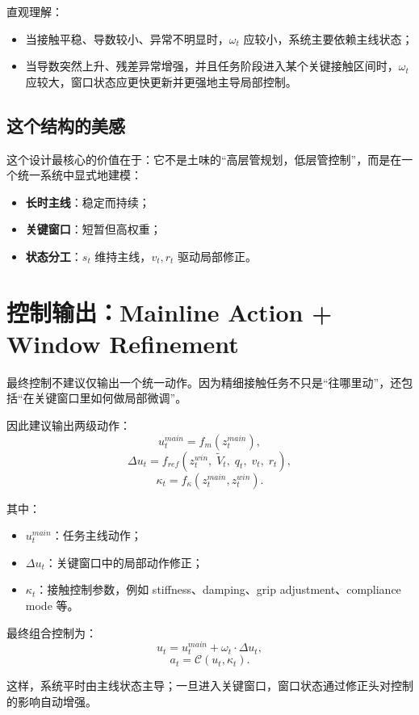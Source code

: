 \documentclass[11pt]{article}
\begin{document}
直观理解：
\begin{itemize}[leftmargin=2em]
    \item 当接触平稳、导数较小、异常不明显时，$\omega_t$ 应较小，系统主要依赖主线状态；
    \item 当导数突然上升、残差异常增强，并且任务阶段进入某个关键接触区间时，$\omega_t$ 应较大，窗口状态应更快更新并更强地主导局部控制。
\end{itemize}

\subsection{这个结构的美感}

这个设计最核心的价值在于：它不是土味的“高层管规划，低层管控制”，而是在一个统一系统中显式地建模：
\begin{itemize}[leftmargin=2em]
    \item \textbf{长时主线}：稳定而持续；
    \item \textbf{关键窗口}：短暂但高权重；
    \item \textbf{状态分工}：$s_t$ 维持主线，$v_t,r_t$ 驱动局部修正。
\end{itemize}

\section{控制输出：Mainline Action + Window Refinement}

最终控制不建议仅输出一个统一动作。因为精细接触任务不只是“往哪里动”，还包括“在关键窗口里如何做局部微调”。

因此建议输出两级动作：
\[
u_t^{main} = f_m(z_t^{main}),
\]
\[
\Delta u_t = f_{ref}(z_t^{win},\; \tilde V_t,\; q_t,\; v_t,\; r_t),
\]
\[
\kappa_t = f_\kappa(z_t^{main}, z_t^{win}).
\]

其中：
\begin{itemize}[leftmargin=2em]
    \item $u_t^{main}$：任务主线动作；
    \item $\Delta u_t$：关键窗口中的局部动作修正；
    \item $\kappa_t$：接触控制参数，例如 stiffness、damping、grip adjustment、compliance mode 等。
\end{itemize}

最终组合控制为：
\[
u_t = u_t^{main} + \omega_t \cdot \Delta u_t,
\]
\[
a_t = \mathcal{C}(u_t,\kappa_t).
\]

这样，系统平时由主线状态主导；一旦进入关键窗口，窗口状态通过修正头对控制的影响自动增强。
\end{document}
